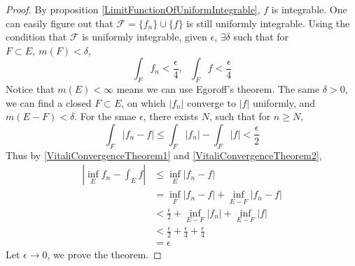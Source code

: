\documentclass[lang=en, 12pt]{elegantbook}
\begin{document}
        \begin{proof}
            By proposition \ref{LimitFunctionOfUniformIntegrable}, 
        $f$ is integrable. One can easily figure out that 
        $\mathcal{F} = \{f_n\}\cup \{f\}$ is still uniformly integrable.
        Using the condition that $\mathcal{F}$ is uniformly integrable,
        given $\epsilon$, $\exists \delta$ such that for $F \subset E 
        , \ m(F)< \delta$, 
        \begin{equation}\label{VitaliConvergenceTheorem1}
            \int_F f_n < \frac{\epsilon}{4} , \ \ \ \int_F f < \frac{\epsilon}{4}
        \end{equation}
        Notice that $m(E)< \infty$ means we can use Egoroff's
        theorem. The same $\delta >0$, we can find a closed $F \subset E$,
        on which $|f_n|$ converge to $|f|$ uniformly, and $m(E-F) <\delta$.
        For the smae $\epsilon$, there exists $N$, such
        that for $n\geq N$, 
        \begin{equation}\label{VitaliConvergenceTheorem2}
            \int_F |f_n - f| \leq \int_F |f_n| - \int_F |f| < \frac{\epsilon}{2}
        \end{equation}
        Thus by \eqref{VitaliConvergenceTheorem1} and \eqref{VitaliConvergenceTheorem2},
        \begin{equation*}
            \begin{aligned}
                |\inf_E f_n -\int_E f| &\leq \inf_E |f_n - f|\\
                &= \inf_F | f_n -f| + \inf_{E-F} | f_n -f|\\
                &< \frac{\epsilon}{2} + \inf_{E-F}|f_n| +\inf_{E-F}|f|\\
                &< \frac{\epsilon}{2} +\frac{\epsilon}{4}+\frac{\epsilon}{4}\\
                &= \epsilon
            \end{aligned}
        \end{equation*}
        Let $\epsilon \to 0$, we prove the theorem.
        \end{proof}
        \begin{theorem}
            
        \end{theorem}
        
\end{document}
